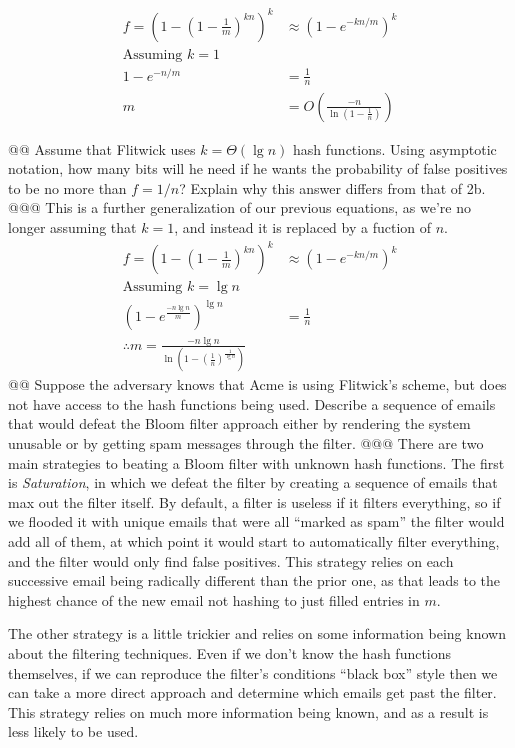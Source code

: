 \documentclass[10pt]{article}
\begin{document}
\begin{easylist}[enumerate]
    \[ \begin{aligned}
        f = {\left(1 - {\left( 1 - \frac{1}{m} \right)}^{kn} \right)}^k &\approx {\left( 1 - e^{-kn/m} \right)}^k\\
        \text{Assuming } k = 1\\
        1 -  e^{-n/m} &= \frac{1}{n}\\
        m &= O\left( \frac{-n}{\ln\left( 1 - \frac{1}{n} \right)} \right)
    \end{aligned} \]

    @@ Assume that Flitwick uses $k = \Theta(\lg n)$ hash functions. Using asymptotic notation, how many bits will he
    need if he wants the probability of false positives to be no more than $f = 1/n$? Explain why this answer differs
    from that of 2b.
    @@@ This is a further generalization of our previous equations, as we're no longer assuming that $k=1$, and instead
    it is replaced by a fuction of $n$.
    \[ \begin{aligned}
        f = {\left(1 - {\left( 1 - \frac{1}{m} \right)}^{kn} \right)}^k &\approx {\left( 1 - e^{-kn/m} \right)}^k\\
        \text{Assuming } k = \lg n\\
        {\left(1 - e^{\frac{-n\lg n}{m} } \right)}^{\lg n} &= \frac{1}{n}\\
        \therefore m = \frac{-n\lg n}{\ln \left( 1 - {\left( \frac{1}{n} \right)}^\frac{1}{\lg n}\right)}
    \end{aligned} \]
    @@ Suppose the adversary knows that Acme is using Flitwick's scheme, but does not have access to the hash functions
    being used. Describe a sequence of emails that would defeat the Bloom filter approach either by rendering the system
    unusable or by getting spam messages through the filter.
    @@@ There are two main strategies to beating a Bloom filter with unknown hash functions. The first is
    \textit{Saturation}, in which we defeat the filter by creating a sequence of emails that max out the filter itself.
    By default, a filter is useless if it filters everything, so if we flooded it with unique emails that were all
    ``marked as spam'' the filter would add all of them, at which point it would start to automatically filter
    everything, and the filter would only find false positives. This strategy relies on each successive email being
    radically different than the prior one, as that leads to the highest chance of the new email not hashing to just
    filled entries in $m$.

    The other strategy is a little trickier and relies on some information being known about the filtering techniques.
    Even if we don't know the hash functions themselves, if we can reproduce the filter's conditions ``black box'' style
    then we can take a more direct approach and determine which emails get past the filter. This strategy relies on much
    more information being known, and as a result is less likely to be used.


\end{easylist}
\end{document}
